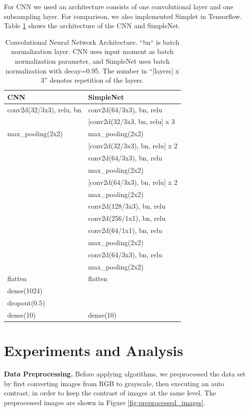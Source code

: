 \documentclass[journal]{IEEEtran}
\begin{document}
For CNN we used an architecture consists of one convolutional layer and one subsampling layer.
For comparison, we also implemented Simplet\cite{simplenet} in Tensorflow.
Table \ref{table:cnn_arch} shows the architecture of the CNN and SimpleNet.

\begin{table}[htb]
\centering
\begin{tabular}{l|l}
\hline
CNN & SimpleNet \\
\hline
conv2d(32/3x3), relu, bn & conv2d(64/3x3), bn, relu \\
 & [conv2d(32/3x3, bn, relu] x 3  \\
max\_pooling(2x2) & max\_pooling(2x2) \\
& [conv2d(32/3x3), bn, relu] x 2 \\
& conv2d(64/3x3), bn, relu \\
& max\_pooling(2x2) \\
& [conv2d(64/3x3), bn, relu] x 2 \\
& max\_pooling(2x2) \\
& conv2d(128/3x3), bn, relu \\
& conv2d(256/1x1), bn, relu \\
& conv2d(64/1x1), bn, relu \\
& max\_pooling(2x2) \\
& conv2d(64/3x3), bn, relu \\
& max\_pooling(2x2) \\
flatten & flatten  \\
dense(1024) &  \\
dropout(0.5) &  \\
dense(10) & dense(10) \\
\hline
\end{tabular}
\caption{Convolutional Neural Network Architecture. ``bn`` is batch normalization layer. CNN uses input moment as batch normalization parameter, and SimpleNet uses batch normalization with decay=0.95. The number in ``[layers] x 3'' denotes repetition of the layers.}
\label{table:cnn_arch}
\end{table}

\section{Experiments and Analysis}

\textbf{Data Preprocessing.} Before applying algorithms, we preprocessed the data set by first converting images from RGB to grayscale, then executing an auto contrast, in order to keep the contrast of images at the same level. The preprocessed images are shown in Figure \ref{fig:preprocessed_images}.
\end{document}
